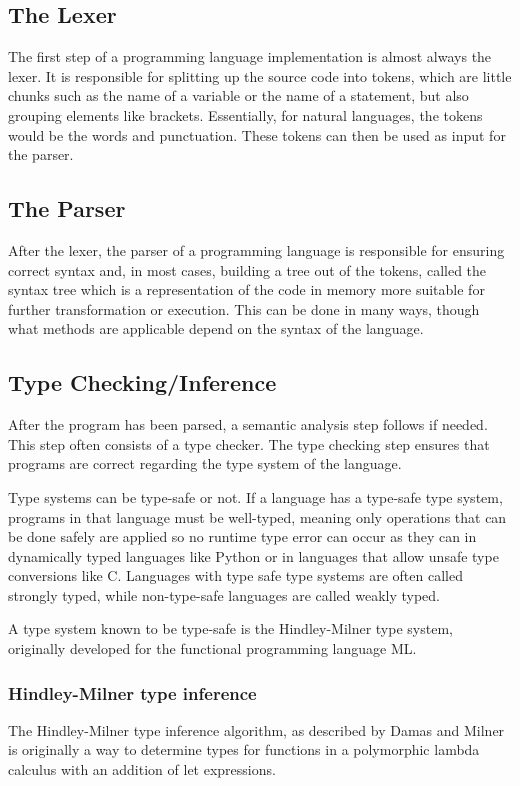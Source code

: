 \documentclass[12pt]{article}
\begin{document}
\subsection{The Lexer}
The first step of a programming language implementation is almost always the lexer.
It is responsible for splitting up the source code into tokens,
which are little chunks such as the name of a variable or the name of a statement,
but also grouping elements like brackets.
Essentially, for natural languages, the tokens would be the words and punctuation.
These tokens can then be used as input for the parser.

\subsection{The Parser}
After the lexer, the parser of a programming language is responsible
for ensuring correct syntax and, in most cases,
building a tree out of the tokens, called the syntax tree which is a representation
of the code in memory more suitable for further transformation or execution.
This can be done in many ways, though what methods are applicable
depend on the syntax of the language.

\subsection{Type Checking/Inference}
After the program has been parsed,
a semantic analysis step follows if needed.
This step often consists of a type checker.
The type checking step ensures that programs are correct
regarding the type system of the language.

Type systems can be type-safe or not.
If a language has a type-safe type system, programs in that language
must be well-typed, meaning only operations that can be done safely are applied
so no runtime type error can occur as they can in dynamically typed
languages like Python or in languages that allow unsafe type conversions like C.
Languages with type safe type systems are often called
strongly typed, while non-type-safe languages are called weakly typed.

A type system known to be type-safe is the Hindley-Milner type system,
originally developed for the functional programming language ML.

\subsubsection{Hindley-Milner type inference}
The Hindley-Milner type inference algorithm, as described by Damas and Milner
\autocite{damasPrincipalTypeschemesFunctional1982}
is originally a way to determine types for functions in a
polymorphic lambda calculus with an addition of let expressions.
\end{document}
